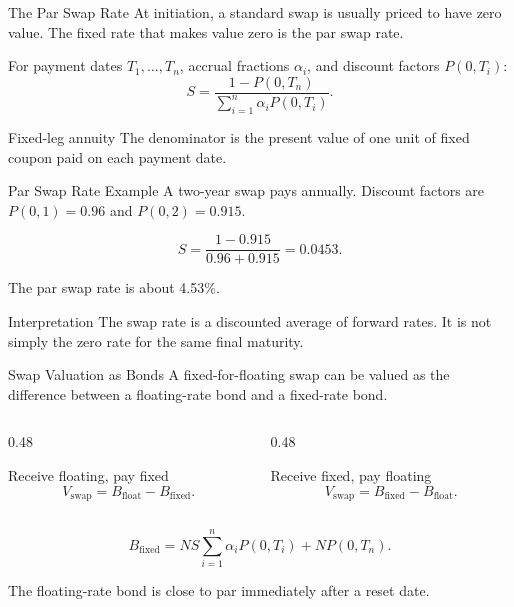 \documentclass[aspectratio=169,11pt]{beamer}
\newcommand{\notional}{N}
\begin{document}
\begin{frame}{The Par Swap Rate}
    At initiation, a standard swap is usually priced to have zero value.
    The fixed rate that makes value zero is the par swap rate.

    For payment dates \(T_1,\ldots,T_n\), accrual fractions \(\alpha_i\), and discount factors \(P(0,T_i)\):
    \[
        S=
        \frac{1-P(0,T_n)}
        {\sum_{i=1}^n \alpha_i P(0,T_i)}.
    \]

    \begin{block}{Fixed-leg annuity}
        The denominator is the present value of one unit of fixed coupon paid on each payment date.
    \end{block}
\end{frame}

\begin{frame}{Par Swap Rate Example}
    A two-year swap pays annually.
    Discount factors are \(P(0,1)=0.96\) and \(P(0,2)=0.915\).

    \[
        S=
        \frac{1-0.915}{0.96+0.915}
        =
        0.0453.
    \]

    The par swap rate is about 4.53\%.

    \begin{block}{Interpretation}
        The swap rate is a discounted average of forward rates.
        It is not simply the zero rate for the same final maturity.
    \end{block}
\end{frame}

\begin{frame}{Swap Valuation as Bonds}
    A fixed-for-floating swap can be valued as the difference between a floating-rate bond and a fixed-rate bond.

    \begin{columns}[T]
        \begin{column}{0.48\textwidth}
            \begin{block}{Receive floating, pay fixed}
                \[
                    V_{\text{swap}}=B_{\text{float}}-B_{\text{fixed}}.
                \]
            \end{block}
        \end{column}
        \begin{column}{0.48\textwidth}
            \begin{block}{Receive fixed, pay floating}
                \[
                    V_{\text{swap}}=B_{\text{fixed}}-B_{\text{float}}.
                \]
            \end{block}
        \end{column}
    \end{columns}

    \[
        B_{\text{fixed}}
        =
        \notional S\sum_{i=1}^n \alpha_i P(0,T_i)
        +\notional P(0,T_n).
    \]

    The floating-rate bond is close to par immediately after a reset date.
\end{frame}
\end{document}
